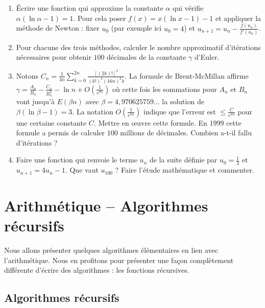 \documentclass[class=report,crop=false]{standalone}
\begin{document}
\begin{miniexercices}
\begin{enumerate}

  \item \'Ecrire une fonction qui approxime la constante $\alpha$ qui vérifie $\alpha (\ln \alpha -1)=1$.
  Pour cela poser $f(x) = x(\ln x - 1)-1$ et appliquer la méthode de Newton : fixer $u_0$ (par exemple ici $u_0=4$)
  et $u_{n+1} = u_n - \frac{f(u_n)}{f'(u_n)}$.

  \item Pour chacune des trois méthodes, calculer le nombre approximatif d'itérations nécessaires
  pour obtenir $100$ décimales de la constante $\gamma$ d'Euler.

  \item Notons $C_n = \frac{1}{4n} \sum_{k=0}^{2n} \frac{[(2k)!]^3}{(k!)^4(16n)^2k}$.
  La formule de Brent-McMillan affirme $\gamma = \frac{A_n}{B_n} - \frac{C_n}{B_n^2} - \ln n + O(\frac{1}{e^{8n}})$
  où cette fois les sommations pour $A_n$ et $B_n$ vont jusqu'à $E(\beta n)$ avec
  $\beta = 4,970625759\ldots$ la solution de $\beta(\ln \beta - 1)=3$. La notation $O(\frac{1}{e^{8n}})$
  indique que l'erreur est $\le \frac{C}{e^{8n}}$ pour une certaine constante $C$.
  Mettre en \oe uvre cette formule. En 1999 cette formule a permis de calculer $100$ millions de décimales.
  Combien a-t-il fallu d'itérations ?

  \item Faire une fonction qui renvoie le terme $u_n$ de la suite définie par $u_0 = \frac 13$
  et $u_{n+1} = 4 u_n -1$. Que vaut $u_{100}$ ? Faire l'étude mathématique et commenter.

\end{enumerate}
\end{miniexercices}


\section{Arithmétique -- Algorithmes récursifs}


Nous allons présenter quelques algorithmes élémentaires en lien avec l'arithmétique.
Nous en profitons pour présenter une façon complètement différente d'écrire des algorithmes :
les fonctions récursives.


\subsection{Algorithmes récursifs}
\end{document}
